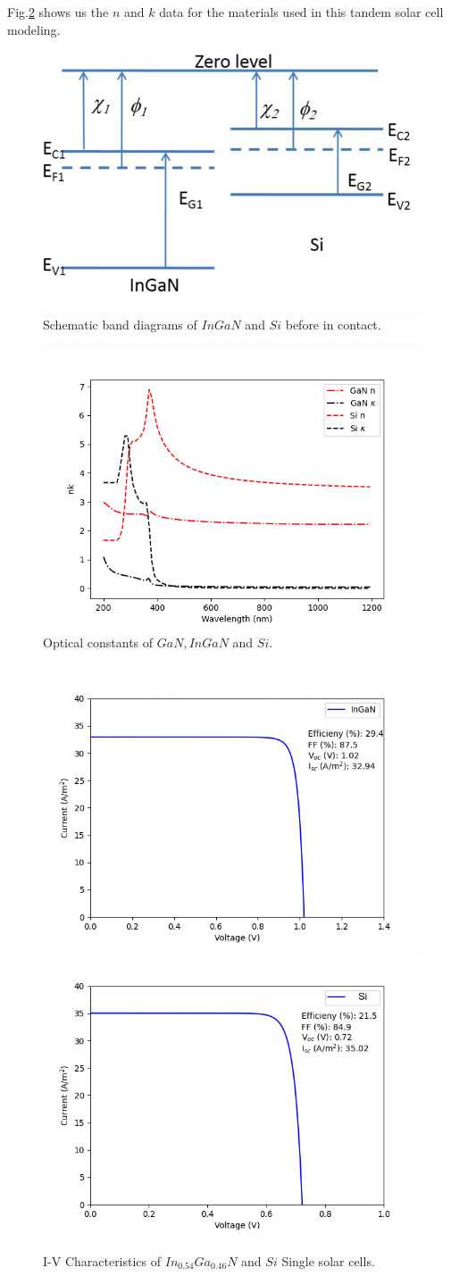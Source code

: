 \documentclass[preprint,12pt]{elsarticle}
\begin{document}
Fig.\ref{fig:nk} shows us the $n$ and $k$ data for the materials used in this tandem solar cell modeling.
\begin{figure}[h!]
	\centering
	\includegraphics[width=0.7\linewidth, height=0.3\textheight]{Figure/Band}
	\caption{Schematic band diagrams of $InGaN$ and $Si$ before in contact.}
	\label{fig:ingansi}
\end{figure}
\begin{figure}[h!]
	\centering
	\includegraphics[width=0.7\linewidth, height=0.3\textheight]{Figure/nk}
	\caption{Optical constants of $GaN, InGaN$ and $Si$.}
	\label{fig:nk}
\end{figure}

\begin{figure}[h!]
	\centering
	\includegraphics[width=0.45\linewidth,
	height=0.25\textheight]{Figure/IV_InGaN}
	\includegraphics[width=0.45\linewidth, height=0.25\textheight]{Figure/IV_Si}
	\caption{I-V Characteristics of $In_{0.54}Ga_{0.46}N$ and $Si$ Single solar cells.}
	\label{fig:iv}
\end{figure}
\end{document}
